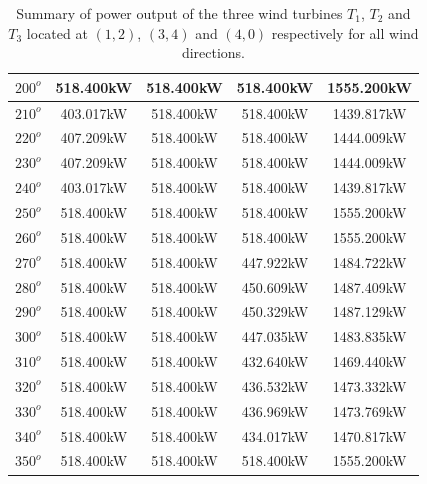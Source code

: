 \begin{table}[H]
\begin{tabular}{|c|c|c|c|c|}
	     \hline
	     $200^{o}$ & 518.400kW & 518.400kW & 518.400kW & 1555.200kW \\
	     \hline
	     $210^{o}$ & 403.017kW & 518.400kW & 518.400kW & 1439.817kW \\
	     \hline
	     $220^{o}$ & 407.209kW & 518.400kW & 518.400kW & 1444.009kW \\
	     \hline
	     $230^{o}$ & 407.209kW & 518.400kW & 518.400kW & 1444.009kW \\
	     \hline
	     $240^{o}$ & 403.017kW & 518.400kW & 518.400kW & 1439.817kW \\
	     \hline
	     $250^{o}$ & 518.400kW & 518.400kW & 518.400kW & 1555.200kW \\
	     \hline
	     $260^{o}$ & 518.400kW & 518.400kW & 518.400kW & 1555.200kW \\
	     \hline
	     $270^{o}$ & 518.400kW & 518.400kW & 447.922kW & 1484.722kW \\
	     \hline
	     $280^{o}$ & 518.400kW & 518.400kW & 450.609kW & 1487.409kW \\
	     \hline
	     $290^{o}$ & 518.400kW & 518.400kW & 450.329kW & 1487.129kW \\
	     \hline
	     $300^{o}$ & 518.400kW & 518.400kW & 447.035kW & 1483.835kW \\
	     \hline
	     $310^{o}$ & 518.400kW & 518.400kW & 432.640kW & 1469.440kW \\
	     \hline
	     $320^{o}$ & 518.400kW & 518.400kW & 436.532kW & 1473.332kW \\
	     \hline
	     $330^{o}$ & 518.400kW & 518.400kW & 436.969kW & 1473.769kW \\
	     \hline
	     $340^{o}$ & 518.400kW & 518.400kW & 434.017kW & 1470.817kW \\
	     \hline
	     $350^{o}$ & 518.400kW & 518.400kW & 518.400kW & 1555.200kW \\
	     \hline
	    \end{tabular}
	    \caption{Summary of power output of the three wind turbines $T_1$, $T_2$ and $T_3$ located at $(1,2)$, $(3,4)$ and $(4,0)$ respectively for all wind directions.}
	    \label{summaryRandom3-3b}
	\end{table}
	\doublespacing

	
	
	
	
	
	
	
